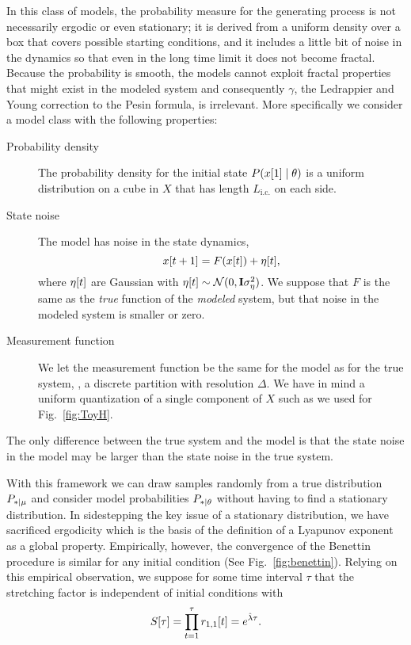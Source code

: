 In this class of models, the probability measure for the generating
process is not necessarily ergodic or even stationary; it is derived
from a uniform density over a box that covers possible starting
conditions, and it includes a little bit of noise in the dynamics so
that even in the long time limit it does not become fractal.  Because
the probability is smooth, the models cannot exploit fractal
properties that might exist in the modeled system and consequently
$\gamma$, the Ledrappier and Young correction to the Pesin formula, is
irrelevant.  More specifically we consider a model class with the
following properties: \newcommand{\Lic}{L_{\text{i.c.}}}
\begin{description}
\item[Probability density] The probability density for the initial
  state $P({x}{[1]}\mid \theta)$ is a uniform distribution on a cube in
  $X$ that has length $\Lic$ on each side.
\item[State noise] The model has noise in the state dynamics,
  \begin{equation}
    \label{eq:PracticalStateMap}
    {x}{[t+1]} = F({x}{[t]}) + {\eta}{[t]},
  \end{equation}
  where ${\eta}{[t]}$ are \iid Gaussian with ${\eta}{[t]} \sim
  {\mathcal{N}}(0,{\bf I} \sigma_\eta^2)$.  We suppose that $F$ is the same as
  the \emph{true} function of the \emph{modeled} system, but that
  noise in the modeled system is smaller or zero.
\item[Measurement function] We let the measurement function be the
  same for the model as for the true system, \ie, a discrete partition
  with resolution $\Delta$.  We have in mind a uniform quantization of
  a single component of $X$ such as we used for Fig.~\ref{fig:ToyH}.
\end{description}
The only difference between the true system and the model is that the
state noise in the model may be larger than the state noise in the
true system.

With this framework we can draw samples randomly from a true
distribution $P_{*\mid \mu}$ and consider model probabilities
$P_{*\mid \theta}$ without having to find a stationary distribution.  In
sidestepping the key issue of a stationary distribution, we have
sacrificed ergodicity which is the basis of the definition of a
Lyapunov exponent as a global property.  Empirically, however, the
convergence of the Benettin procedure is similar for any initial
condition (See Fig.~\ref{fig:benettin}).  Relying on this empirical
observation, we suppose for some time interval $\tau$ that the
stretching factor is independent of initial conditions with
\begin{equation}
  \label{eq:Stretch}
  {S}{[\tau]} = \prod_{t=1}^\tau {r_{1,1}}{[t]} = e^{\hat \lambda \tau}.
\end{equation}

